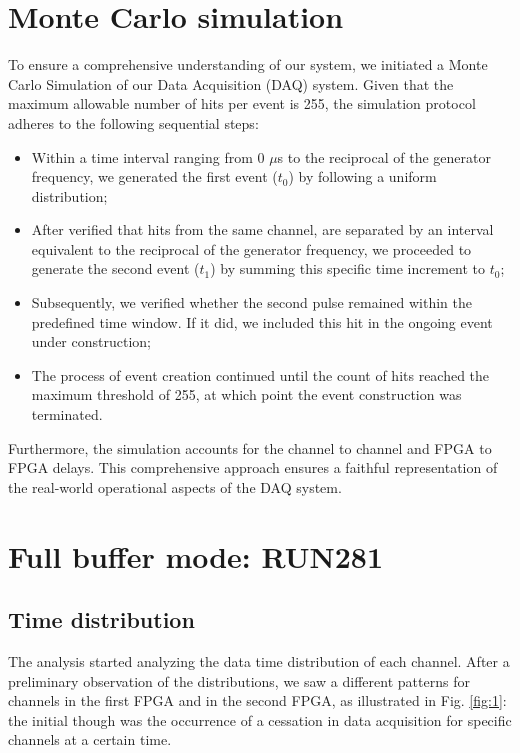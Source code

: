 \documentclass[12pt]{article}
\begin{document}
\section{Monte Carlo simulation}\label{MonteCarlo}
To ensure a comprehensive understanding of our system, we initiated a Monte Carlo Simulation of our Data Acquisition (DAQ) system. 
Given that the maximum allowable number of hits per event is 255, the simulation protocol adheres to the following sequential steps:
\begin{itemize}
  \item Within a time interval ranging from 0 $\mu$s to the reciprocal of the generator frequency, we generated the first event ($t_0$) by following a uniform distribution;
    \item After verified that hits from the same channel, are separated by an interval equivalent to the reciprocal of the generator frequency, we proceeded to 
      generate the second event ($t_1$) by summing this specific time increment to $t_0$;
      \item Subsequently, we verified whether the second pulse remained within the predefined time window. If it did, we included this hit in the ongoing event under construction;
      \item The process of event creation continued until the count of hits reached the maximum threshold of 255, at which point the event construction was terminated.
\end{itemize}
Furthermore, the simulation accounts for the channel to channel and FPGA to FPGA delays. 
This comprehensive approach ensures a faithful representation of the real-world operational aspects of the DAQ system.
\section{Full buffer mode: RUN281}
\subsection{Time distribution}
The analysis started analyzing the data time distribution of each channel.
After a preliminary observation of the distributions, we saw a different patterns for channels in the first FPGA and in the second FPGA,
as illustrated in Fig. \ref{fig:1}: the initial though  was the occurrence of a cessation in data acquisition for specific channels at a certain time.
\end{document}
